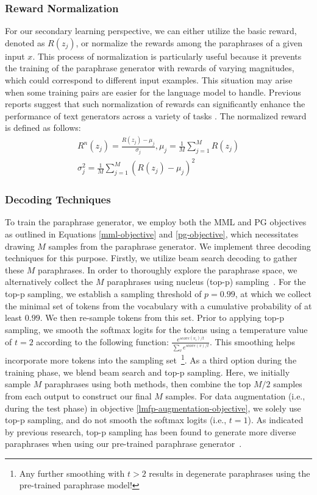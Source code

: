 \documentclass[11pt]{article}
\begin{document}
\subsubsection{Reward Normalization}
For our secondary learning perspective, we can either utilize the basic reward, denoted as $R(z_{j})$, or normalize the rewards among the paraphrases of a given input $x$. This process of normalization is particularly useful because it prevents the training of the paraphrase generator with rewards of varying magnitudes, which could correspond to different input examples. This situation may arise when some training pairs are easier for the language model to handle. Previous reports suggest that such normalization of rewards can significantly enhance the performance of text generators across a variety of tasks \cite{guo-etal-2022-efficient}. The normalized reward is defined as follows:
\begin{multline}
R^{n}(z_{j}) = \frac{R(z_{j}) - \mu_{j}}{\sigma_{j}}, \mu_{j} = \frac{1}{M} \sum^{M}_{j=1} R(z_{j}) \\
\sigma^{2}_{j} = \frac{1}{M} \sum^{M}_{j=1} (R(z_{j}) - \mu_{j})^2
\label{normal-reward}
\end{multline}

\subsubsection{Decoding Techniques}
To train the paraphrase generator, we employ both the MML and PG objectives as outlined in Equations \ref{mml-objective} and \ref{pg-objective}, which necessitates drawing $M$ samples from the paraphrase generator. We implement three decoding techniques for this purpose. Firstly, we utilize beam search decoding to gather these $M$ paraphrases. In order to thoroughly explore the paraphrase space, we alternatively collect the $M$ paraphrases using nucleus (top-p) sampling~\cite{holtzman2020curious}. For the top-p sampling, we establish a sampling threshold of $p=0.99$, at which we collect the minimal set of tokens from the vocabulary with a cumulative probability of at least $0.99$. We then re-sample tokens from this set. Prior to applying top-p sampling, we smooth the softmax logits for the tokens using a temperature value of $t=2$ according to the following function: $\frac{e^{score(v_i)/t}}{\sum_{v} e^{score(v)/t}}$. This smoothing helps incorporate more tokens into the sampling set~\footnote{Any further smoothing with $t>2$ results in degenerate paraphrases using the pre-trained paraphrase model!}. As a third option during the training phase, we blend beam search and top-p sampling. Here, we initially sample $M$ paraphrases using both methods, then combine the top $M/2$ samples from each output to construct our final $M$ samples. For data augmentation (i.e., during the test phase) in objective \ref{lmfp-augmentation-objective}, we solely use top-p sampling, and do not smooth the softmax logits (i.e., $t=1$). As indicated by previous research, top-p sampling has been found to generate more diverse paraphrases when using our pre-trained paraphrase generator~\cite{xu-etal-2020-autoqa}.
\end{document}
